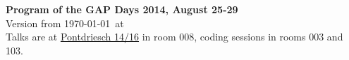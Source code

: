 \documentclass[11pt,a4paper]{article}
\begin{document}
\begin{center}
{\huge\textbf{Program of the GAP Days 2014, August 25-29}\\[2mm]}
Version from \today\ at \currenttime\\[2mm]
Talks are at \href{https://maps.google.com/maps?q=Pontdriesch+14,+Aachen,+Germany&hl=en&ll=50.778617,6.080579&spn=0.004993,0.008969&sll=37.0625,-95.677068&sspn=50.777825,73.476563&oq=pontdriesch+14+&hnear=Pontdriesch+14,+Mitte+52062+Aachen,+Germany&t=m&z=17}{Pontdriesch 14/16}
in room 008, coding sessions in rooms 003 and 103.
\end{center}

\newcommand{\vortrag}[3]{#1 & #2 \\ & \textit{#3} \\}

\newcommand{\newday}[1]{\multicolumn{2}{c}{{\large\textbf{#1}}} \\[1em]}
\end{document}
